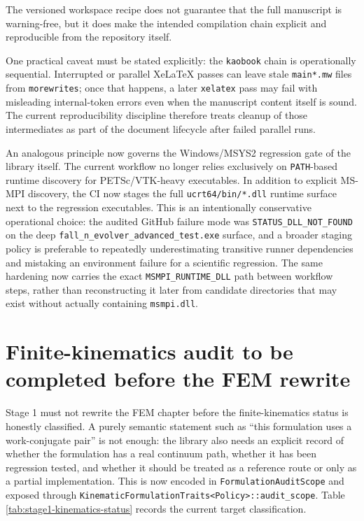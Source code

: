 The versioned workspace recipe does not guarantee that the full manuscript is
warning-free, but it does make the intended compilation chain explicit and
reproducible from the repository itself.

One practical caveat must be stated explicitly: the \texttt{kaobook} chain is
operationally sequential.  Interrupted or parallel XeLaTeX passes can leave
stale \texttt{main*.mw} files from \texttt{morewrites}; once that happens, a
later \texttt{xelatex} pass may fail with misleading internal-token errors even
when the manuscript content itself is sound.  The current reproducibility
discipline therefore treats cleanup of those intermediates as part of the
document lifecycle after failed parallel runs.

An analogous principle now governs the Windows/MSYS2 regression gate of the
library itself.  The current workflow no longer relies exclusively on
\texttt{PATH}-based runtime discovery for PETSc/VTK-heavy executables.  In
addition to explicit MS-MPI discovery, the CI now stages the full
\texttt{ucrt64/bin/*.dll} runtime surface next to the regression executables.
This is an intentionally conservative operational choice: the audited GitHub
failure mode was \texttt{STATUS\_DLL\_NOT\_FOUND} on the deep
\texttt{fall\_n\_evolver\_advanced\_test.exe} surface, and a broader staging
policy is preferable to repeatedly underestimating transitive runner
dependencies and mistaking an environment failure for a scientific regression.
The same hardening now carries the exact \texttt{MSMPI\_RUNTIME\_DLL} path
between workflow steps, rather than reconstructing it later from candidate
directories that may exist without actually containing \texttt{msmpi.dll}.

\section{Finite-kinematics audit to be completed before the FEM rewrite}

Stage 1 must not rewrite the FEM chapter before the finite-kinematics status is
honestly classified.  A purely semantic statement such as ``this formulation
uses a work-conjugate pair'' is not enough: the library also needs an explicit
record of whether the formulation has a real continuum path, whether it has
been regression tested, and whether it should be treated as a reference route
or only as a partial implementation.  This is now encoded in
\texttt{FormulationAuditScope} and exposed through
\texttt{KinematicFormulationTraits<Policy>::audit\_scope}.  Table
\ref{tab:stage1-kinematics-status} records the current target classification.

